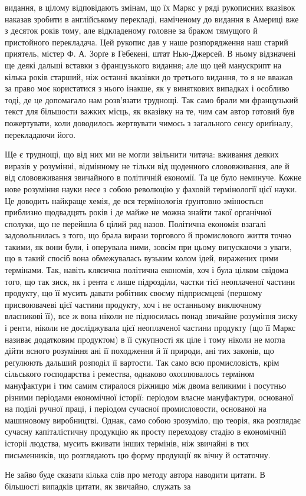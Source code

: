 \parcont{}  %
видання, в цілому відповідають змінам, що їх Маркс у ряді рукописних
вказівок наказав зробити в англійському перекладі, наміченому
до видання в Америці вже з десяток років тому, але відкладеному
головне за браком тямущого й пристойного перекладача.
Цей рукопис дав у наше розпорядження наш старий приятель,
містер Ф. А. Зорґе в Гебекені, штат Нью-Джерсей. В ньому
відзначені ще деякі дальші вставки з французького видання;
але що цей манускрипт на кілька років старший, ніж останні вказівки
до третього видання, то я не вважав за право моє користатися
з нього інакше, як у виняткових випадках і особливо тоді,
де це допомагало нам розв’язати труднощі. Так само брали ми
французький текст для більшости важких місць, як вказівку на те,
чим сам автор готовий був пожертувати, коли доводилось жертвувати
чимось з загального сенсу ориґіналу, перекладаючи його.

Ще є труднощі, що від них ми не могли звільнити читача: вживання
деяких виразів у розумінні, відмінному не тільки від щоденного
слововживання, але й від слововживання звичайного в
політичній економії. Та це було неминуче. Кожне нове розуміння
науки несе з собою революцію у фаховій термінології цієї науки.
Це доводить найкраще хемія, де вся термінологія ґрунтовно змінюється
приблизно щодвадцять років і де майже не можна знайти
такої органічної сполуки, що не перейшла б цілий ряд назов.
Політична економія взагалі задовольнилась з того, що брала
вирази торгового й промислового життя точно такими, як вони
були, і оперувала ними, зовсім при цьому випускаючи з уваги, що
в такий спосіб вона обмежувалась вузьким колом ідей, виражених
цими термінами. Так, навіть клясична політична економія, хоч
і була цілком свідома того, що так зиск, як і рента є лише підрозділи,
частки тієї неоплаченої частини продукту, що її мусить
давати робітник своєму підприємцеві (першому присвоювачеві
цієї частини продукту, хоч і не останньому виключному власникові
її), все ж вона ніколи не підносилась понад звичайне розуміння
зиску і ренти, ніколи не досліджувала цієї неоплаченої
частини продукту (що її Маркс називає додатковим продуктом)
в її сукупності як ціле і тому ніколи не могла дійти ясного розуміння
ані її походження й її природи, ані тих законів, що реґулюють
дальший розподіл її вартости. Так само всю промисловість,
крім сільського господарства і ремества, однаково охоплювалось
терміном мануфактури і тим самим стиралося ріжницю між двома
великими і посутньо різними періодами економічної історії: періодом
власне мануфактури, основаної на поділі ручної праці,
і періодом сучасної промисловости, основаної на машиновому
виробництві. Однак, само собою зрозуміло, що теорія, яка розглядає
сучасну капіталістичну продукцію як просту переходову
стадію в економічній історії людства, мусить вживати інших
термінів, ніж звичайні в тих письменників, що розглядають цю
форму продукції як вічну й остаточну.

Не зайво буде сказати кілька слів про методу автора наводити
цитати. В більшості випадків цитати, як звичайно, служать за
\parbreak{}  %
